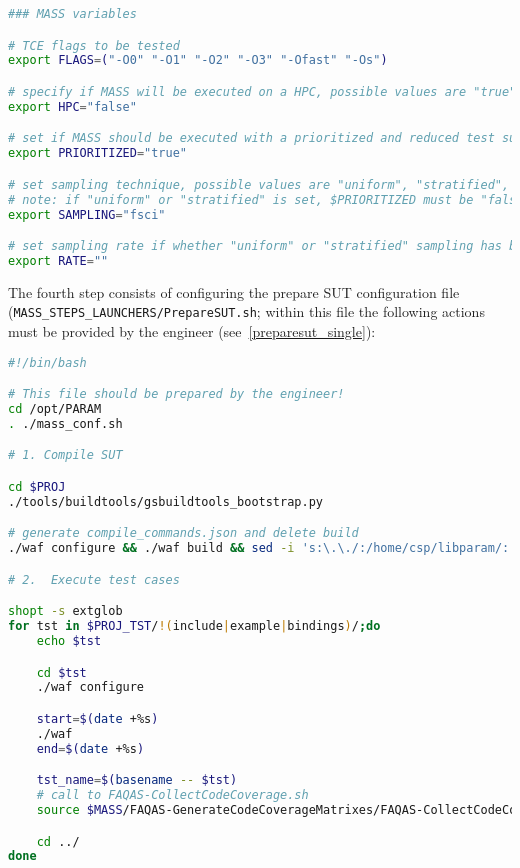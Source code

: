 \begin{lstlisting}[language=bash, label=mass_conf_specific, caption=\MASS specific variables. Excerpt of mass\_conf.sh file.]
### MASS variables

# TCE flags to be tested 
export FLAGS=("-O0" "-O1" "-O2" "-O3" "-Ofast" "-Os")

# specify if MASS will be executed on a HPC, possible values are "true" or "false"
export HPC="false"

# set if MASS should be executed with a prioritized and reduced test suite
export PRIORITIZED="true"

# set sampling technique, possible values are "uniform", "stratified", and "fsci"
# note: if "uniform" or "stratified" is set, $PRIORITIZED must be "false"
export SAMPLING="fsci"

# set sampling rate if whether "uniform" or "stratified" sampling has been selected
export RATE=""
\end{lstlisting}

The fourth step consists of configuring the prepare SUT configuration file \\(\texttt{MASS\_STEPS\_LAUNCHERS/PrepareSUT.sh}; within this file the following actions must be provided by the engineer (see~\ref{preparesut_single}):

\begin{lstlisting}[language=bash, label=preparesut_single, caption=PrepareSUT.sh file.]
#!/bin/bash

# This file should be prepared by the engineer!
cd /opt/PARAM
. ./mass_conf.sh

# 1. Compile SUT

cd $PROJ
./tools/buildtools/gsbuildtools_bootstrap.py

# generate compile_commands.json and delete build
./waf configure && ./waf build && sed -i 's:\.\./:/home/csp/libparam/:' build/compile_commands.json && mv build/compile_commands.json $MUTANTS_DIR

# 2.  Execute test cases

shopt -s extglob
for tst in $PROJ_TST/!(include|example|bindings)/;do
    echo $tst

    cd $tst
    ./waf configure

    start=$(date +%s)
    ./waf
    end=$(date +%s)

    tst_name=$(basename -- $tst)
    # call to FAQAS-CollectCodeCoverage.sh
    source $MASS/FAQAS-GenerateCodeCoverageMatrixes/FAQAS-CollectCodeCoverage.sh $tst_name "$(($end-$start))"

    cd ../
done
\end{lstlisting}

